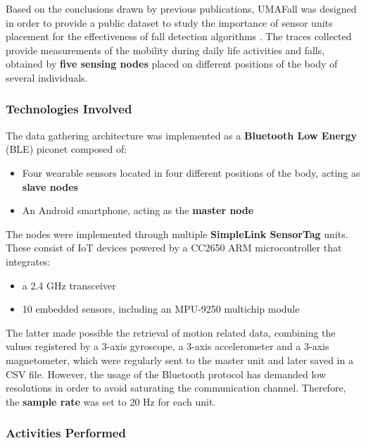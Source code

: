 Based on the conclusions drawn by previous publications, UMAFall was designed in order to provide a public dataset to study the importance of sensor units placement for the effectiveness of fall detection algorithms \cite{umafall}. The traces collected provide measurements of the mobility during daily life activities and falls, obtained by \textbf{five sensing nodes} placed on different positions of the body of several individuals.

\subsubsection{Technologies Involved}\label{subsubsec:umafall-technologies}

The data gathering architecture was implemented as a \textbf{Bluetooth Low Energy} (BLE) piconet composed of:

\begin{itemize}
    \item Four wearable sensors located in four different positions of the body, acting as \textbf{slave nodes}
    \item An Android smartphone, acting as the \textbf{master node}
\end{itemize}

The nodes were implemented through multiple \textbf{SimpleLink SensorTag} units. These consist of IoT devices powered by a CC2650 ARM microcontroller that integrates: 

\begin{itemize}
    \item a 2.4 GHz transceiver
    \item 10 embedded sensors, including an MPU-9250 multichip module
\end{itemize}

The latter made possible the retrieval of motion related data, combining the values registered by a 3-axis gyroscope, a 3-axis accelerometer and a 3-axis magnetometer, which were regularly sent to the master unit and later saved in a CSV file. However, the usage of the Bluetooth protocol has demanded low resolutions in order to avoid saturating the communication channel. Therefore, the \textbf{sample rate} was set to 20 Hz for each unit.

\subsubsection{Activities Performed}\label{subsubsec:umafall-activities}

